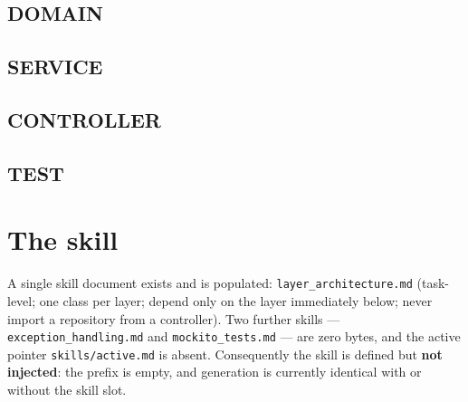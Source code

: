 \documentclass[11pt,a4paper]{article}
\begin{document}

\subsection{DOMAIN}


\subsection{SERVICE}


\subsection{CONTROLLER}


\subsection{TEST}


\section{The skill}

A single skill document exists and is populated: \texttt{layer\_architecture.md}
(task-level; one class per layer; depend only on the layer immediately below; never
import a repository from a controller). Two further skills ---
\texttt{exception\_handling.md} and \texttt{mockito\_tests.md} --- are zero bytes, and
the active pointer \texttt{skills/active.md} is absent. Consequently the skill is
defined but \textbf{not injected}: the prefix is empty, and generation is currently
identical with or without the skill slot.

\end{document}
